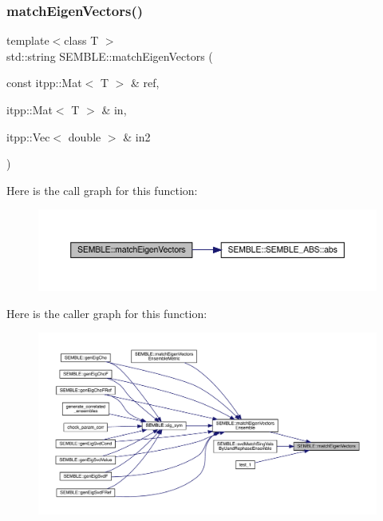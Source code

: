 \subsubsection{\texorpdfstring{matchEigenVectors()}{matchEigenVectors()}}
{\footnotesize\ttfamily template$<$class T $>$ \\
std\+::string S\+E\+M\+B\+L\+E\+::match\+Eigen\+Vectors (\begin{DoxyParamCaption}\item[{const itpp\+::\+Mat$<$ T $>$ \&}]{ref,  }\item[{itpp\+::\+Mat$<$ T $>$ \&}]{in,  }\item[{itpp\+::\+Vec$<$ double $>$ \&}]{in2 }\end{DoxyParamCaption})}

Here is the call graph for this function\+:
\nopagebreak
\begin{figure}[H]
\begin{center}
\leavevmode
\includegraphics[width=350pt]{d7/dfd/namespaceSEMBLE_a7e0af5033a46ccd68accbec344be1f4e_cgraph}
\end{center}
\end{figure}
Here is the caller graph for this function\+:
\nopagebreak
\begin{figure}[H]
\begin{center}
\leavevmode
\includegraphics[width=350pt]{d7/dfd/namespaceSEMBLE_a7e0af5033a46ccd68accbec344be1f4e_icgraph}
\end{center}
\end{figure}
\mbox{\label{namespaceSEMBLE_ad0d009c5dcbf4da0e2270b14f667ee70}} 
